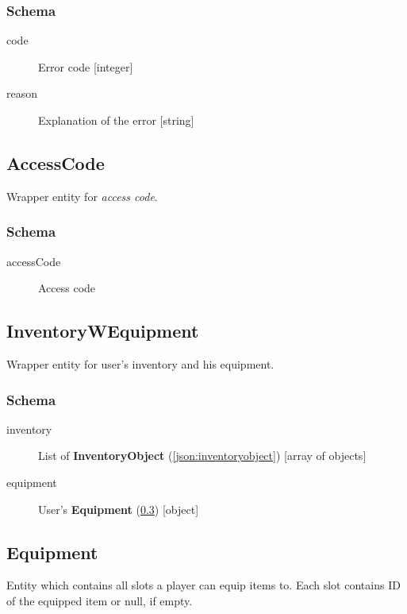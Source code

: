 		\subsubsection{Schema}
			\begin{description}
				\item[code] Error code [integer]
				\item[reason] Explanation of the error [string]
			\end{description}

	\subsection{AccessCode}
		\label{json:accesscode}
		Wrapper entity for \textit{access code}.
		\subsubsection{Schema}
			\begin{description}
				\item[accessCode] Access code
			\end{description}

	\subsection{InventoryWEquipment}
		\label{json:inventoryequipment}
		Wrapper entity for user's inventory and his equipment.		
		\subsubsection{Schema}
			\begin{description}
				\item[inventory] List of \textbf{InventoryObject} (\ref{json:inventoryobject}) [array of objects]
				\item[equipment] User's \textbf{Equipment} (\ref{json:equipment}) [object]
			\end{description}
	
	\subsection{Equipment}
		\label{json:equipment}
		Entity which contains all slots a player can equip items to. Each slot contains ID of the equipped item or null, if empty. 
